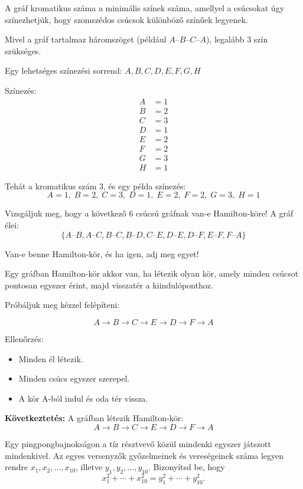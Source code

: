 \begin{solution}
	A gráf kromatikus száma a minimális színek száma, amellyel a csúcsokat
	úgy színezhetjük, hogy szomszédos csúcsok különböző színűek legyenek.
	
	Mivel a gráf tartalmaz háromszöget (például $A\text{–}B\text{–}C\text{–}A$),
	legalább 3 szín szükséges.
	
	Egy lehetséges színezési sorrend: $A,B,C,D,E,F,G,H$
	
	Színezés: 
	\[
	\begin{aligned}A & =1\\
		B & =2\\
		C & =3\\
		D & =1\\
		E & =2\\
		F & =2\\
		G & =3\\
		H & =1
	\end{aligned}
	\]
	
	Tehát a kromatikus szám $\boxed{3}$, és egy példa színezés: 
	\[
	A=1,\;B=2,\;C=3,\;D=1,\;E=2,\;F=2,\;G=3,\;H=1
	\]
	
\end{solution}

\begin{extraproblem}
	Vizsgáljuk meg, hogy a következő 6 csúcsú gráfnak van-e Hamilton-köre!
	A gráf élei: 
	\[
	\{A\text{–}B,A\text{–}C,B\text{–}C,B\text{–}D,C\text{–}E,D\text{–}E,D\text{–}F,E\text{–}F,F\text{–}A\}
	\]
	
	Van-e benne Hamilton-kör, és ha igen, adj meg egyet! 
\end{extraproblem}

\vspace{1em}

\begin{solution}
	Egy gráfban Hamilton-kör akkor van, ha létezik olyan kör, amely minden
	csúcsot pontosan egyszer érint, majd visszatér a kiindulóponthoz.
	
	Próbáljuk meg kézzel felépíteni:
	
	\[
	A\rightarrow B\rightarrow C\rightarrow E\rightarrow D\rightarrow F\rightarrow A
	\]
	
	Ellenőrzés: 
	\begin{itemize}
		\item Minden él létezik. 
		\item Minden csúcs egyszer szerepel. 
		\item A kör A-ból indul és oda tér vissza. 
	\end{itemize}
	\textbf{Következtetés:} A gráfban létezik Hamilton-kör: 
	\[
	\boxed{A\rightarrow B\rightarrow C\rightarrow E\rightarrow D\rightarrow F\rightarrow A}
	\]
\end{solution}
\begin{extraproblem}
	Egy pingpongbajnokságon a tíz résztvevő közül mindenki egyszer játszott
	mindenkivel. Az egyes versenyzők győzelmeinek és vereségeinek száma
	legyen rendre $x_{1},x_{2},\ldots,x_{10}$, illetve $y_{1},y_{2},\ldots,y_{10}$.
	Bizonyítsd be, hogy 
	\[
	x_{1}^{2}+\cdots+x_{10}^{2}=y_{1}^{2}+\cdots+y_{10}^{2}.
	\]
\end{extraproblem}


